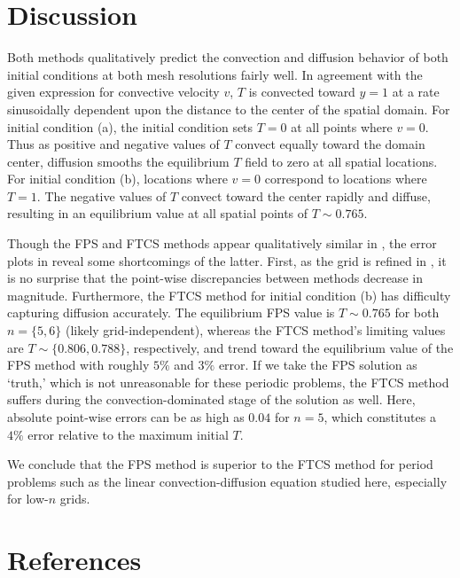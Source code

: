 \documentclass[11pt]{article}
\begin{document}
\section{Discussion} %

Both methods qualitatively predict the convection and diffusion behavior of both initial conditions at both mesh resolutions fairly well. In agreement with the given expression for convective velocity $v$, $T$ is convected toward $y=1$ at a rate sinusoidally dependent upon the distance to the center of the spatial domain. For initial condition (a), the initial condition sets $T=0$ at all points where $v=0$. Thus as positive and negative values of $T$ convect equally toward the domain center, diffusion smooths the equilibrium $T$ field to zero at all spatial locations. For initial condition (b), locations where $v=0$ correspond to locations where $T=1$. The negative values of $T$ convect toward the center rapidly and diffuse, resulting in an equilibrium value at all spatial points of $T \sim 0.765$.

Though the FPS and FTCS methods appear qualitatively similar in , the error plots in  reveal some shortcomings of the latter. First, as the grid is refined in , it is no surprise that the point-wise discrepancies between methods decrease in magnitude. Furthermore, the FTCS method for initial condition (b) has difficulty capturing diffusion accurately. The equilibrium FPS value is $T \sim 0.765$ for both $n=\{5,6\}$ (likely grid-independent), whereas the FTCS method's limiting values are $T \sim \{0.806, 0.788\}$, respectively, and trend toward the equilibrium value of the FPS method with roughly $5\%$ and $3\%$ error. If we take the FPS solution as `truth,' which is not unreasonable for these periodic problems, the FTCS method suffers during the convection-dominated stage of the solution as well. Here, absolute point-wise errors can be as high as $0.04$ for $n=5$, which constitutes a $4\%$ error relative to the maximum initial $T$.

We conclude that the FPS method is superior to the FTCS method for period problems such as the linear convection-diffusion equation studied here, especially for low-$n$ grids.

\section{References} %
\end{document}
